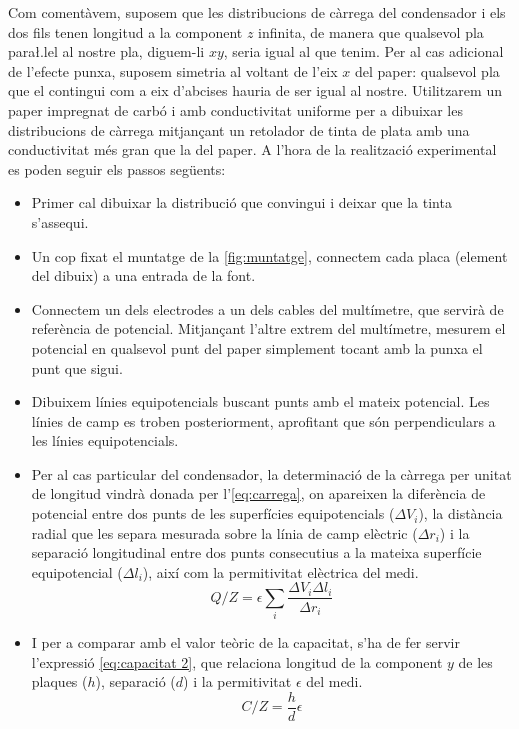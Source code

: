 Com comentàvem, suposem que les distribucions de càrrega del condensador i els dos fils tenen longitud a la component $z$ infinita, de manera que qualsevol pla para\l.lel al nostre pla, diguem-li $xy$, seria igual al que tenim. Per al cas adicional de l'efecte punxa, suposem simetria al voltant de l'eix $x$ del paper: qualsevol pla que el contingui com a eix d'abcises hauria de ser igual al nostre. Utilitzarem un paper impregnat de carbó i amb conductivitat uniforme per a dibuixar les distribucions de càrrega mitjançant un retolador de tinta de plata amb una conductivitat més gran que la del paper. A l'hora de la realització experimental es poden seguir els passos següents:
\begin{itemize}
	\item Primer cal dibuixar la distribució que convingui i deixar que la tinta s'assequi.
	\item Un cop fixat el muntatge de la \cref{fig:muntatge}, connectem cada placa (element del dibuix) a una entrada de la font.
	\item Connectem un dels electrodes a un dels cables del multímetre, que servirà de referència de potencial. Mitjançant l'altre extrem del multímetre, mesurem el potencial en qualsevol punt del paper simplement tocant amb la punxa el punt que sigui.
	\item Dibuixem línies equipotencials buscant punts amb el mateix potencial. Les línies de camp es troben posteriorment, aprofitant que són perpendiculars a les línies equipotencials.
	\item Per al cas particular del condensador, la determinació de la càrrega per unitat de longitud vindrà donada per l'\cref{eq:carrega}, on apareixen la diferència de potencial entre dos punts de les superfícies equipotencials ($\Delta V_i$), la distància radial que les separa mesurada sobre la línia de camp elèctric
		($\Delta r_i$) i la separació longitudinal entre dos punts consecutius a la mateixa superfície equipotencial ($\Delta l_i$), així com la permitivitat elèctrica del medi.
		\begin{equation}\label{eq:carrega}
			Q/Z=\epsilon \sum_i \frac{\Delta V_i \Delta l_i}{\Delta r_i}
		\end{equation}
	\item I per a comparar amb el valor teòric de la capacitat, s'ha de fer servir l'expressió \cref{eq:capacitat 2}, que relaciona longitud de la component $y$ de les plaques ($h$), separació ($d$) i la permitivitat  $\epsilon$ del medi.
		\begin{equation}\label{eq:capacitat 2} 
			C/Z=\frac{h}{d}\epsilon
		\end{equation}
\end{itemize}

